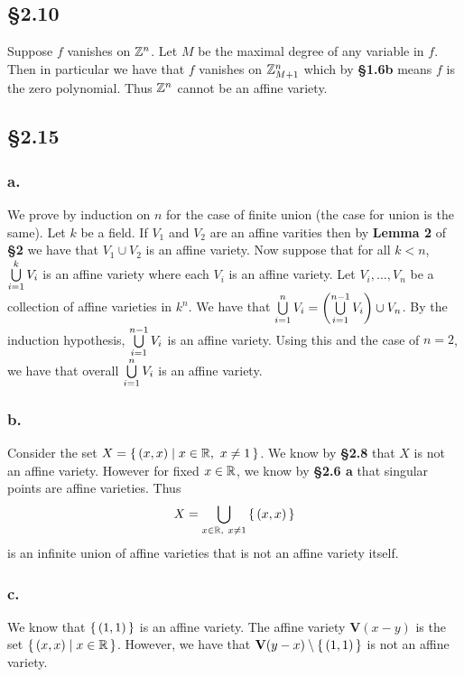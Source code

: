 \documentclass[letterpaper]{article}
\begin{document}
\subsection{\S 2.10}

Suppose $f$ vanishes on $\mathbb{Z}^{n}$. Let $M$ be the maximal degree of any variable in $f$. Then in particular we have that $f$ vanishes on $\mathbb{Z}_{M + 1}^{n}$ which by \textbf{\S 1.6b} means $f$ is the zero polynomial. Thus $\mathbb{Z}^{n}$ cannot be an affine variety.

\subsection{\S 2.15}

\subsubsection{a.} We prove by induction on $n$ for the case of finite union (the case for union is the same). Let $k$ be a field. If $V_{1}$ and $V_{2}$ are an affine varities then by \textbf{Lemma 2} of \textbf{\S 2} we have that $V_{1} \cup V_{2}$ is an affine variety. Now suppose that for all $k < n$, $\bigcup\limits_{i = 1}^{k} V_{i}$ is an affine variety where each $V_{i}$ is an affine variety. Let $V_{i}, \ldots, V_{n}$ be a collection of affine varieties in $k^{n}$. We have that $\Bigcup_{i = 1}^{n} V_{i} = \pqty{\Bigcup_{i = 1}^{n - 1} V_{i}} \cup V_{n}$. By the induction hypothesis, $\bigcup\limits_{i = 1}^{n - 1} V_{i}$ is an affine variety. Using this and the case of $n = 2$, we have that overall $\bigcup\limits_{i = 1}^{n} V_{i}$ is an affine variety.

\subsubsection{b.}

Consider the set $X = \set{(x, x) | x \in \mathbb{R},~ x \neq 1}$. We know by \textbf{\S 2.8} that $X$ is not an affine variety. However for fixed $x \in \mathbb{R}$, we know by \textbf{\S 2.6 a} that singular points are affine varieties. Thus
\[
  X = \bigcup_{x \in \mathbb{R},~ x \neq 1}\set{(x, x)}
\]
is an infinite union of affine varieties that is not an affine variety itself.

\subsubsection{c.}

We know that $\set{(1, 1)}$ is an affine variety. The affine variety $\textbf{V}(x - y)$ is the set $\set{(x, x) | x \in \mathbb{R}}$. However, we have that $\textbf{V}(y - x) \setminus \set{(1, 1)}$ is not an affine variety.
\end{document}
